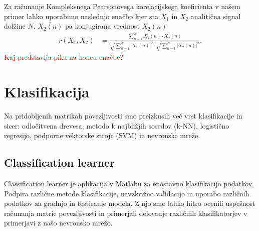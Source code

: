 \newpage
Za računanje Kompleksnega Pearsonovega korelacijskega koeficienta v našem primer lahko uporabimo naslednjo enačbo kjer sta $X_1$ in $X_2$ analitična signal dolžine $N$. $\overline{X_2(n)}$ pa konjugirana vrednost $X_2(n)$
\begin{align*}
r(X_1, X_2) &= \frac{\sum\limits_{n=1}^{N} X_1(n) \cdot \overline{X_2(n)}}{\sqrt{\sum\limits_{n=1}^{N} |X_1(n)|^2} \cdot \sqrt{\sum\limits_{n=1}^{N} |X_2(n)|^2}}.
\end{align*}
\textcolor{red}{Kaj predstavlja pika na koncu enačbe?}




\cite{sverko_complex_2022} 

\section{Klasifikacija}
Na pridobljenih matrikah povezljivosti smo preizkusili več vrst klasifikacije in sicer: odločitvena drevesa, metodo k najbližjih sosedov (k-NN), logistično regresijo, podporne vektorske stroje (SVM) in nevronske mreže.
\subsection{Classification learner}
Classification learner je aplikacija v Matlabu za enostavno klasifikacijo podatkov. Podpira različne metode klasifikacije, navzkrižno validacijo in uporabo različnih podatkov za gradnjo in testiranje modela. Z njo smo lahko hitro ocenili uspešnost računanja matric povezljivosti in primerjali delovanje različnih klasifikatorjev v primerjavi z našo nevronsko mrežo.
\newpage
